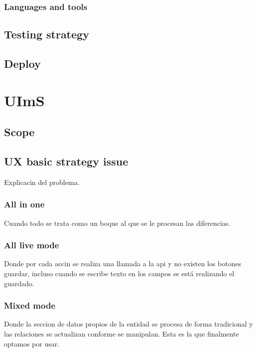 \documentclass[oneside,english,titlepage]{scrbook}
\begin{document}
\subsubsection{Languages and tools}

\subsection{Testing strategy}

\subsection{Deploy}

\section{UImS}

\subsection{Scope}

\subsection{UX basic strategy issue}

Explicacin del problema.

\subsubsection{All in one}

Cuando todo se trata como un boque al que se le procesan las diferencias.

\subsubsection{All live mode}

Donde por cada accin se realiza una llamada a la api y no existen
los botones guardar, incluso cuando se escribe texto en los campos
se está realizando el guardado.

\subsubsection{Mixed mode}

Donde la seccion de datos propios de la entidad se procesa de forma
tradicional y las relaciones se actualizan conforme se manipulan.
Esta es la que finalmente optamos por usar.
\end{document}
